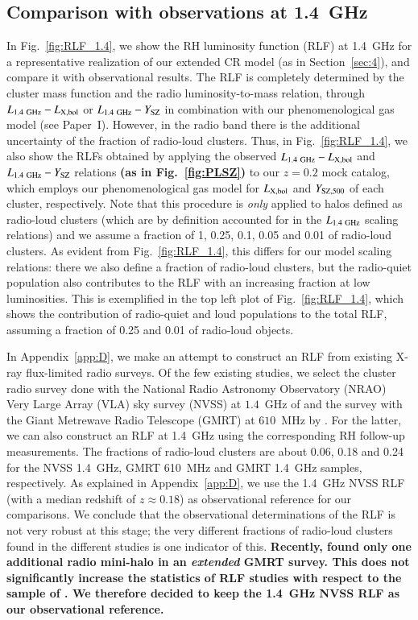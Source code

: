 \documentclass[useAMS,usenatbib]{mn2e}
\begin{document}
\subsection{Comparison with observations at 1.4~GHz}

In Fig.~\ref{fig:RLF_1.4}, we show the RH luminosity function (RLF) at 1.4~GHz
for a representative realization of our extended CR model (as in
Section~\ref{sec:4}), and compare it with observational results.  The RLF is
completely determined by the cluster mass function and the radio
luminosity-to-mass relation, through $L_{1.4~{\mathrm{GHz}}}-L_{ {\mathrm{X,bol}}}$ or
$L_{1.4~{\mathrm{GHz}}}-Y_{{\mathrm{SZ}}}$ in combination with our phenomenological gas
model (see Paper~I). However, in the radio band there is the additional
uncertainty of the fraction of radio-loud clusters. Thus, in
Fig.~\ref{fig:RLF_1.4}, we also show the RLFs obtained by applying the observed
$L_{1.4~{\mathrm{GHz}}}-L_{{\mathrm{X,bol}}}$ and $L_{1.4~{\mathrm{GHz}}}-Y_{{\mathrm{SZ}}}$
relations {\bf (as in Fig.~\ref{fig:PLSZ})} to our $z = 0.2$ mock catalog, which
employs our phenomenological gas model for $L_{{\mathrm{X,bol}}}$ and $Y_{{\mathrm{SZ}},
  500}$ of each cluster, respectively. Note that this procedure is {\em only}
applied to halos defined as radio-loud clusters (which are by definition
accounted for in the $L_{1.4~{\mathrm{GHz}}}$ scaling relations) and we assume a
fraction of 1, 0.25, 0.1, 0.05 and 0.01 of radio-loud clusters. As evident from
Fig.~\ref{fig:RLF_1.4}, this differs for our model scaling relations: there we
also define a fraction of radio-loud clusters, but the radio-quiet population
also contributes to the RLF with an increasing fraction at low
luminosities. This is exemplified in the top left plot of
Fig.~\ref{fig:RLF_1.4}, which shows the contribution of radio-quiet and loud
populations to the total RLF, assuming a fraction of 0.25 and 0.01 of radio-loud
objects.

In Appendix~\ref{app:D}, we make an attempt to construct an RLF from existing
X-ray flux-limited radio surveys. Of the few existing studies, we select the
cluster radio survey done with the National Radio Astronomy Observatory (NRAO)
Very Large Array (VLA) sky survey (NVSS) at $1.4$~GHz of
\cite{1999NewA....4..141G} and the survey with the Giant Metrewave Radio
Telescope (GMRT) at $610$~MHz by \cite{VenturiGMRT_1,VenturiGMRT_2}. For the
latter, we can also construct an RLF at 1.4~GHz using the corresponding RH
follow-up measurements. The fractions of radio-loud clusters are about 0.06,
0.18 and 0.24 for the NVSS 1.4~GHz, GMRT 610~MHz and GMRT 1.4~GHz samples,
respectively. As explained in Appendix~\ref{app:D}, we use the 1.4~GHz NVSS RLF
(with a median redshift of $z \approx 0.18$) as observational reference for our
comparisons. We conclude that the observational determinations of the RLF is not
very robust at this stage; the very different fractions of radio-loud clusters
found in the different studies is one indicator of this. {\bf Recently,
  \cite{2013arXiv1306.3102K} found only one additional radio mini-halo in an
  \emph{extended} GMRT survey. This does not significantly increase the
  statistics of RLF studies with respect to the sample of
  \cite{VenturiGMRT_1,VenturiGMRT_2}. We therefore decided to keep the 1.4~GHz
  NVSS RLF as our observational reference.}
  
\end{document}
